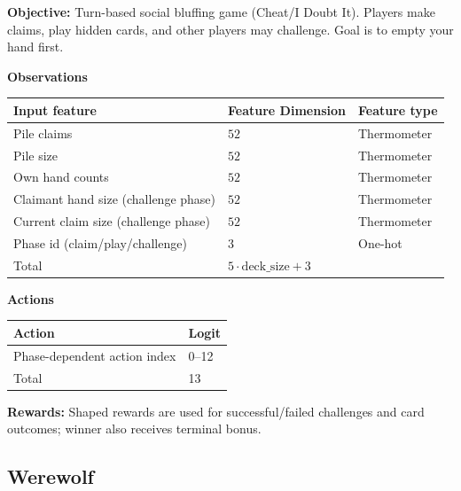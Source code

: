 \textbf{Objective:} Turn-based social bluffing game (Cheat/I Doubt It). Players make claims, play hidden cards, and other players may challenge. Goal is to empty your hand first.

\textbf{Observations}
\begin{center}
    \begin{tabular}{lll}
    \hline
        Input feature & Feature Dimension & Feature type \\ \hline
        Pile claims & $52$ & Thermometer \\
        Pile size & $52$ & Thermometer \\
        Own hand counts & $52$ & Thermometer \\
        Claimant hand size (challenge phase) & $52$ & Thermometer \\
        Current claim size (challenge phase) & $52$ & Thermometer \\
        Phase id (claim/play/challenge) & 3 & One-hot \\
        \hline
        Total & $5 \cdot \text{deck\_size} + 3$ & \\
        \hline
    \end{tabular}
\end{center}

\textbf{Actions}
\begin{center}
    \begin{tabular}{ll}
    \hline
        Action & Logit \\ \hline
        Phase-dependent action index & 0--12 \\
        \hline
        Total & 13 \\
        \hline
    \end{tabular}
\end{center}

\textbf{Rewards:} Shaped rewards are used for successful/failed challenges and card outcomes; winner also receives terminal bonus.

\subsection{Werewolf}

